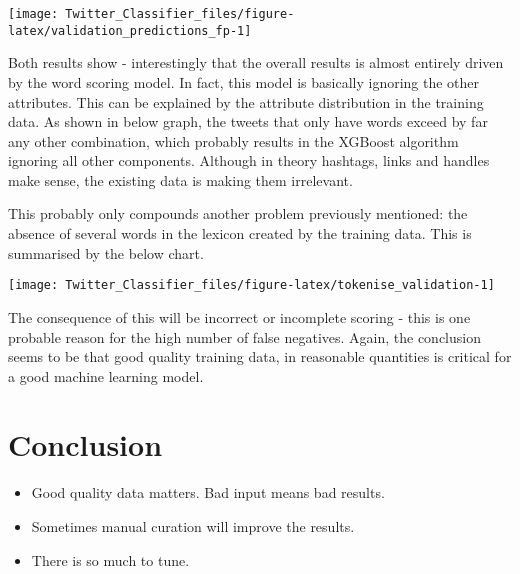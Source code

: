 \documentclass[11pt,]{article}
\providecommand{\tightlist}{%
  \setlength{\itemsep}{0pt}\setlength{\parskip}{0pt}}
\begin{document}
\begin{center}\texttt{[image: Twitter\_Classifier\_files/figure-latex/validation\_predictions\_fp-1]} \end{center}

Both results show - interestingly that the overall results is almost
entirely driven by the word scoring model. In fact, this model is
basically ignoring the other attributes. This can be explained by the
attribute distribution in the training data. As shown in below graph,
the tweets that only have words exceed by far any other combination,
which probably results in the XGBoost algorithm ignoring all other
components. Although in theory hashtags, links and handles make sense,
the existing data is making them irrelevant.

This probably only compounds another problem previously mentioned: the
absence of several words in the lexicon created by the training data.
This is summarised by the below chart.

\begin{center}\texttt{[image: Twitter\_Classifier\_files/figure-latex/tokenise\_validation-1]} \end{center}

The consequence of this will be incorrect or incomplete scoring - this
is one probable reason for the high number of false negatives. Again,
the conclusion seems to be that good quality training data, in
reasonable quantities is critical for a good machine learning model.

\hypertarget{conclusion}{%
\section{Conclusion}\label{conclusion}}

\begin{itemize}
\tightlist
\item
  Good quality data matters. Bad input means bad results.
\item
  Sometimes manual curation will improve the results.
\item
  There is so much to tune.
\end{itemize}
\end{document}
